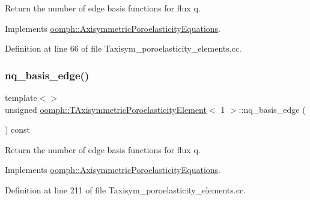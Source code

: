 Return the number of edge basis functions for flux q. 



Implements \hyperlink{classoomph_1_1AxisymmetricPoroelasticityEquations_aa5141d30c6dc0d4209ae043ddcea3d2e}{oomph\+::\+Axisymmetric\+Poroelasticity\+Equations}.



Definition at line 66 of file Taxisym\+\_\+poroelasticity\+\_\+elements.\+cc.

\mbox{\label{classoomph_1_1TAxisymmetricPoroelasticityElement_ac8bf7a876d0d1411cdeda49d416b3369}} 
\subsubsection{\texorpdfstring{nq\+\_\+basis\+\_\+edge()}{nq\_basis\_edge()}\hspace{0.1cm}{\footnotesize\ttfamily [2/3]}}
{\footnotesize\ttfamily template$<$$>$ \\
unsigned \hyperlink{classoomph_1_1TAxisymmetricPoroelasticityElement}{oomph\+::\+T\+Axisymmetric\+Poroelasticity\+Element}$<$ 1 $>$\+::nq\+\_\+basis\+\_\+edge (\begin{DoxyParamCaption}{ }\end{DoxyParamCaption}) const\hspace{0.3cm}{\ttfamily [virtual]}}



Return the number of edge basis functions for flux q. 



Implements \hyperlink{classoomph_1_1AxisymmetricPoroelasticityEquations_aa5141d30c6dc0d4209ae043ddcea3d2e}{oomph\+::\+Axisymmetric\+Poroelasticity\+Equations}.



Definition at line 211 of file Taxisym\+\_\+poroelasticity\+\_\+elements.\+cc.

\mbox{\label{classoomph_1_1TAxisymmetricPoroelasticityElement_a55279875613735471b7b925116e85292}} 
